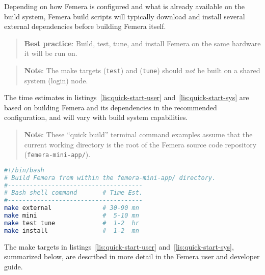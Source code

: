 Depending on how Femera is configured and what is already available
on the build system, Femera build scripts will typically download
and install several external dependencies before building Femera itself.
\begin{verse}
\textbf{Best practice}:
Build, test, tune, and install Femera on the same hardware it will be run on.
\end{verse}
\begin{comment}
tdd:tests/post-build/make\_test\_did\_check\_runtime\_fmrmodel.py
\end{comment}
\begin{verse}
\textbf{Note}:
The make targets (\texttt{test}) and (\texttt{tune})
should \textit{not} be built on a shared system (login) node.
\end{verse}
The time estimates in listings~\ref{lis:quick-start-user}
and~\ref{lis:quick-start-sys} are based
on building Femera and its dependencies in the recommended configuration,
and will vary with build system capabilities.
\begin{comment}
tdd:tests/pre-build/sys\_has\_fewer\_than\_5\_users.py
\end{comment}
\begin{verse}
\textbf{Note}:
These ``quick build'' terminal command examples
assume that the current working directory is the root of the
Femera source code repository (\texttt{femera-mini-app/}).
\end{verse}

\begin{center}
\begin{lstlisting}[caption={Build and install Femera in a user directory.},
label={lis:quick-start-user},language=bash,float=ht]
#!/bin/bash
# Build Femera from within the femera-mini-app/ directory.
#-------------------------------------
# Bash shell command       # Time Est.
#-------------------------------------
make external              # 30-90 mn
make mini                  #  5-10 mn
make test tune             #  1-2  hr
make install               #  1-2  mn
\end{lstlisting}
\begin{comment}
tdd:tests/post-build/make\_time\_in\_user\_guide\_is\_correct.py
\end{comment}
\end{center}

The make targets in
listings~\ref{lis:quick-start-user} and~\ref{lis:quick-start-sys},
summarized below, are described in more detail in
the Femera user and developer guide.

